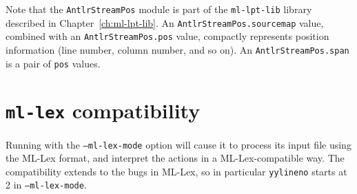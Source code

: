 Note that the {\tt AntlrStreamPos} module is part of the {\tt ml-lpt-lib} library described in Chapter~\ref{ch:ml-lpt-lib}.  An {\tt AntlrStreamPos.sourcemap} value, combined with an {\tt AntlrStreamPos.pos} value, compactly represents position information (line number, column number, and so on).  An {\tt AntlrStreamPos.span} is a pair of {\tt pos} values.

\section{{\tt ml-lex} compatibility}\label{sec:lex-compat}

Running \ulex{} with the {\tt --ml-lex-mode} option will cause it to process its input file using the ML-Lex format, and interpret the actions in a ML-Lex-compatible way.  The compatibility extends to the bugs in ML-Lex, so in particular \texttt{yylineno} starts at 2 in {\tt --ml-lex-mode}.